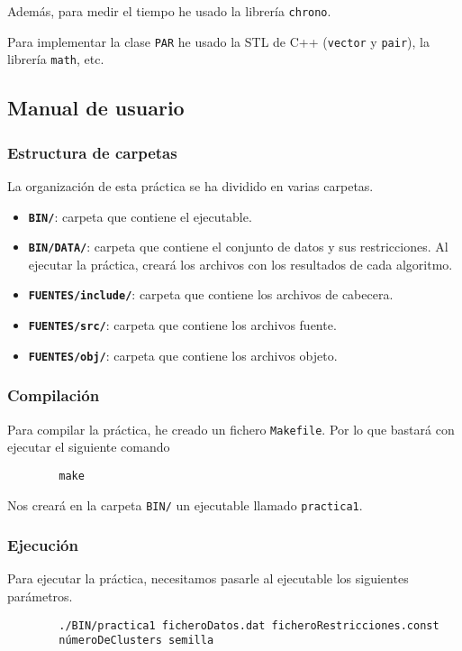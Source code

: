 	Además, para medir el tiempo he usado la librería \lstinline!chrono!.

	Para implementar la clase \lstinline!PAR! he usado la STL de C++ (\lstinline!vector! y \lstinline!pair!), la librería \lstinline!math!, etc.

	\subsection{Manual de usuario}
		\subsubsection{Estructura de carpetas}
			La organización de esta práctica se ha dividido en varias carpetas.
			
			\begin{itemize}
				\item \textbf{\lstinline!BIN/!}: carpeta que contiene el ejecutable.
				\item \textbf{\lstinline!BIN/DATA/!}: carpeta que contiene el conjunto de datos y sus restricciones.
				Al ejecutar la práctica, creará los archivos con los resultados de cada algoritmo.
				\item \textbf{\lstinline!FUENTES/include/!}: carpeta que contiene los archivos de cabecera.
				\item \textbf{\lstinline!FUENTES/src/!}: carpeta que contiene los archivos fuente.
				\item \textbf{\lstinline!FUENTES/obj/!}: carpeta que contiene los archivos objeto.
			\end{itemize}

		\subsubsection{Compilación}
			Para compilar la práctica, he creado un fichero \lstinline!Makefile!. Por lo que bastará con ejecutar el siguiente comando
		\begin{lstlisting}
		make
		\end{lstlisting}
			Nos creará en la carpeta \lstinline!BIN/! un ejecutable llamado \lstinline!practica1!.

		\subsubsection{Ejecución}
			Para ejecutar la práctica, necesitamos pasarle al ejecutable los siguientes parámetros.

		\begin{lstlisting}
		./BIN/practica1 ficheroDatos.dat ficheroRestricciones.const 
		númeroDeClusters semilla
		\end{lstlisting}

